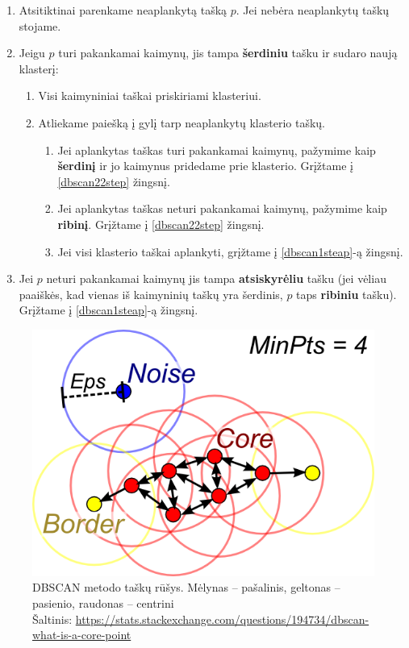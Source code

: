 \documentclass{VUMIFInfKursinis}
\begin{document}
\begin{enumerate}
\item
  Atsitiktinai parenkame neaplankytą tašką $p$. Jei nebėra
  neaplankytų taškų stojame.\label{dbscan1steap}
\item
  Jeigu $p$ turi pakankamai kaimynų, jis tampa \textbf{šerdiniu}
  tašku ir sudaro naują klasterį:

  \begin{enumerate}
  \item
    Visi kaimyniniai taškai priskiriami klasteriui.
  \item
    Atliekame paiešką į gylį tarp neaplankytų klasterio taškų.\label{dbscan22step}

    \begin{enumerate}
    \item
      Jei aplankytas taškas turi pakankamai kaimynų, pažymime kaip
      \textbf{šerdinį} ir jo kaimynus pridedame prie klasterio. Grįžtame
      į \ref{dbscan22step} žingsnį.
    \item
      Jei aplankytas taškas neturi pakankamai kaimynų, pažymime kaip
      \textbf{ribinį}. Grįžtame į \ref{dbscan22step} žingsnį.
    \item
      Jei visi klasterio taškai aplankyti, grįžtame į \ref{dbscan1steap}-ą žingsnį.
    \end{enumerate}
  \end{enumerate}
\item
  Jei $p$ neturi pakankamai kaimynų jis tampa \textbf{atsiskyrėliu}
  tašku (jei vėliau paaiškės, kad vienas iš kaimyninių taškų yra
  šerdinis, $p$ taps \textbf{ribiniu} tašku). Grįžtame į \ref{dbscan1steap}-ą
  žingsnį.
\end{enumerate}

\begin{figure}[H]
\centering
\includegraphics[scale=2.0]{img/DBSCANpts}
\caption{DBSCAN metodo taškų rūšys. Mėlynas – pašalinis, geltonas – pasienio, raudonas – centrini\\
		     Šaltinis: \url{https://stats.stackexchange.com/questions/194734/dbscan-what-is-a-core-point}}
\end{figure}
\end{document}
